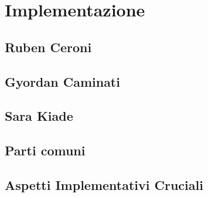 \chapter{Implementazione}


\section{Ruben Ceroni}
\section{Gyordan Caminati}
\section{Sara Kiade}
\section{Parti comuni}
\section{Aspetti Implementativi Cruciali}